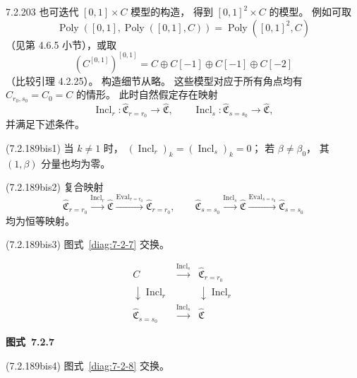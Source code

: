 \begin{remark}{7.2.203}\label{rem:7-2-203}
也可迭代 $[0,1]\times C$ 模型的构造，
得到 $[0,1]^2\times C$ 的模型。
例如可取
\[
\operatorname{Poly}
([0,1],\operatorname{Poly}([0,1],C))
=\operatorname{Poly}([0,1]^2,C)
\]
（见第 4.6.5 小节），或取
\[
(C^{[0,1]})^{[0,1]}
=C\oplus C[-1]\oplus C[-1]\oplus C[-2]
\]
（比较引理 4.2.25）。
构造细节从略。
这些模型对应于所有角点均有
$C_{r_0,s_0}=C_0=C$ 的情形。
此时自然假定存在映射
\[
\operatorname{Incl}_r\colon
\widehat{\mathfrak C}_{r=r_0}
\longrightarrow\widehat{\mathfrak C},
\qquad
\operatorname{Incl}_s\colon
\widehat{\mathfrak C}_{s=s_0}
\longrightarrow\widehat{\mathfrak C},
\]
并满足下述条件。

\noindent\textup{(7.2.189bis1)}
当 $k\ne1$ 时，
$(\operatorname{Incl}_r)_k
=(\operatorname{Incl}_s)_k=0$；
若 $\beta\ne\beta_0$，
其 $(1,\beta)$ 分量也均为零。

\noindent\textup{(7.2.189bis2)}
复合映射
\[
\widehat{\mathfrak C}_{r=r_0}
\xrightarrow{\operatorname{Incl}_r}
\widehat{\mathfrak C}
\xrightarrow{\operatorname{Eval}_{r=r_0}}
\widehat{\mathfrak C}_{r=r_0},
\qquad
\widehat{\mathfrak C}_{s=s_0}
\xrightarrow{\operatorname{Incl}_s}
\widehat{\mathfrak C}
\xrightarrow{\operatorname{Eval}_{s=s_0}}
\widehat{\mathfrak C}_{s=s_0}
\]
均为恒等映射。

\noindent\textup{(7.2.189bis3)}
图式~\ref{diag:7-2-7} 交换。

\par\medskip\noindent\begin{minipage}{\textwidth}
\centering
\[
\begin{array}{ccc}
C&\xrightarrow{\operatorname{Incl}_s}&
\widehat{\mathfrak C}_{r=r_0}\\[1ex]
\downarrow\scriptstyle\operatorname{Incl}_r&&
\downarrow\scriptstyle\operatorname{Incl}_r\\[1ex]
\widehat{\mathfrak C}_{s=s_0}&
\xrightarrow{\operatorname{Incl}_s}&
\widehat{\mathfrak C}
\end{array}
\]
\par{\renewcommand{\thefigure}{7.2.7}
\normalfont\bfseries 图式~\thefigure\label{diag:7-2-7}}
\end{minipage}\par\medskip

\noindent\textup{(7.2.189bis4)}
图式~\ref{diag:7-2-8} 交换。


\end{remark}
